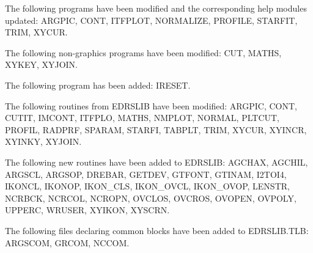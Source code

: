 The following programs have been modified and the corresponding help modules
updated:
ARGPIC, CONT, ITFPLOT, NORMALIZE, PROFILE, STARFIT, TRIM, XYCUR.

The following non-graphics programs have been modified:
CUT, MATHS, XYKEY, XYJOIN.

The following program has been added:
IRESET.

The following routines from EDRSLIB have been modified:
ARGPIC, CONT, CUTIT, IMCONT, ITFPLO, MATHS, NMPLOT, NORMAL, PLTCUT, PROFIL,
RADPRF, SPARAM, STARFI, TABPLT, TRIM, XYCUR, XYINCR, XYINKY, XYJOIN.

The following new routines have been added to EDRSLIB:
AGCHAX, AGCHIL, ARGSCL, ARGSOP, DREBAR, GETDEV, GTFONT, GTINAM, I2TOI4, IKONCL,
IKONOP, IKON\_CLS, IKON\_OVCL, IKON\_OVOP, LENSTR, NCRBCK, NCRCOL, NCROPN,
OVCLOS, OVCROS, OVOPEN, OVPOLY, UPPERC, WRUSER, XYIKON, XYSCRN.

The following files declaring common blocks have been added to EDRSLIB.TLB:
ARGSCOM, GRCOM, NCCOM.

